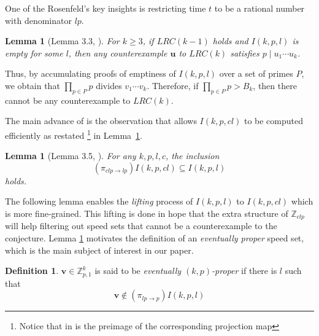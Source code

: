 \documentclass[11pt]{amsart}
\newcommand{\Int}[1]{\mathbb Z_{#1}}
\newcommand{\vbf}{\mathbf{v}}
\newcommand{\ubf}{\mathbf{u}}
\newtheorem{lemma}[theorem]{Lemma}
\theoremstyle{definition}
\newtheorem{definition}[theorem]{Definition}
\theoremstyle{remark}
\begin{document}
One of the Rosenfeld's \cite{Rosenfeld} key insights is restricting time $t$ to be a rational number with denominator $lp$.

\begin{lemma}[Lemma 3.3, \cite{Trakulthongchai}] \label{divp}
    For $k\geq3$, if $LRC(k-1)$ holds and $I(k,p,l)$ is empty for some $l$, then any counterexample
    $\ubf$ to $LRC(k)$ satisfies $p \mid u_1 \cdots u_k$. 
\end{lemma}

Thus, by accumulating proofs of emptiness of $I(k,p,l)$ over a set of primes $P$, we obtain that $\prod_{p \in P} p$ 
divides $v_1\cdots v_k$. Therefore, if $\prod_{p \in P} p > B_k$, then there cannot be any counterexample to $LRC(k)$.

The main advance of \cite{Trakulthongchai} is the observation that allows $I(k,p,cl)$ to be computed efficiently as restated
\footnote{Notice that  in \cite{Trakulthongchai} is the preimage of the corresponding projection map} 
in Lemma~\ref{shadowing}.

\begin{lemma}[Lemma 3.5, \cite{Trakulthongchai}] \label{shadowing}
  For any $k, p, l, c$, the inclusion 
  \[ (\pi_{clp \to lp}) I(k,p,cl) \subseteq I(k,p,l) \]
  holds.
\end{lemma}

The following lemma enables the \emph{lifting} process of $I(k,p,l)$ to $I(k,p,cl)$ which is more fine-grained.
This lifting is done in hope that the extra structure of $\Int{clp}$ will help filtering out speed sets that cannot 
be a counterexample to the conjecture.
Lemma \ref{shadowing} motivates the definition of an \emph{eventually proper} speed set, 
which is the main subject of interest in our paper.
\begin{definition}
  \label{def:eventualproper}
  $\vbf \in \Int{p,1}^k$ is said to be \emph{eventually $(k,p)$-proper} if there is $l$ such 
  that \[ \vbf \notin (\pi_{lp \to p}) I(k, p, l) \]
\end{definition}
\end{document}
